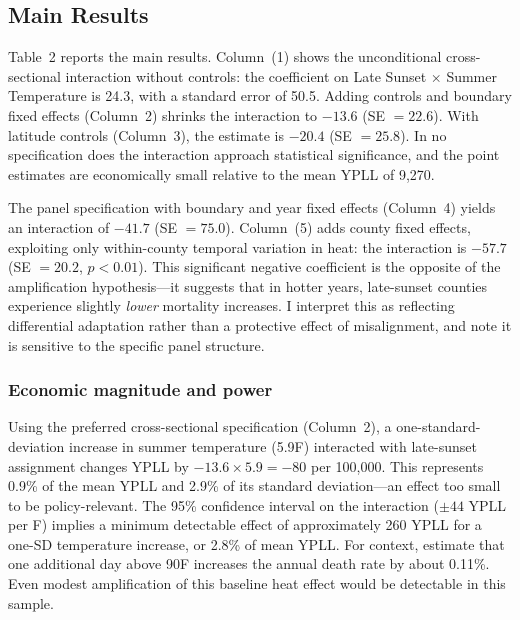 \documentclass[12pt]{article}
\begin{document}
\subsection{Main Results}

{\footnotesize}

Table~2 reports the main results. Column~(1) shows the unconditional cross-sectional interaction without controls: the coefficient on Late Sunset $\times$ Summer Temperature is 24.3, with a standard error of 50.5. Adding controls and boundary fixed effects (Column~2) shrinks the interaction to $-13.6$ (SE $= 22.6$). With latitude controls (Column~3), the estimate is $-20.4$ (SE $= 25.8$). In no specification does the interaction approach statistical significance, and the point estimates are economically small relative to the mean YPLL of 9,270.

The panel specification with boundary and year fixed effects (Column~4) yields an interaction of $-41.7$ (SE $= 75.0$). Column~(5) adds county fixed effects, exploiting only within-county temporal variation in heat: the interaction is $-57.7$ (SE $= 20.2$, $p < 0.01$). This significant negative coefficient is the opposite of the amplification hypothesis---it suggests that in hotter years, late-sunset counties experience slightly \textit{lower} mortality increases. I interpret this as reflecting differential adaptation rather than a protective effect of misalignment, and note it is sensitive to the specific panel structure.

\subsubsection*{Economic magnitude and power} Using the preferred cross-sectional specification (Column~2), a one-standard-deviation increase in summer temperature (5.9\textdegree{}F) interacted with late-sunset assignment changes YPLL by $-13.6 \times 5.9 = -80$ per 100,000. This represents 0.9\% of the mean YPLL and 2.9\% of its standard deviation---an effect too small to be policy-relevant. The 95\% confidence interval on the interaction ($\pm 44$ YPLL per \textdegree{}F) implies a minimum detectable effect of approximately 260 YPLL for a one-SD temperature increase, or 2.8\% of mean YPLL. For context, \citet{deschenes2011climate} estimate that one additional day above 90\textdegree{}F increases the annual death rate by about 0.11\%. Even modest amplification of this baseline heat effect would be detectable in this sample.
\end{document}
